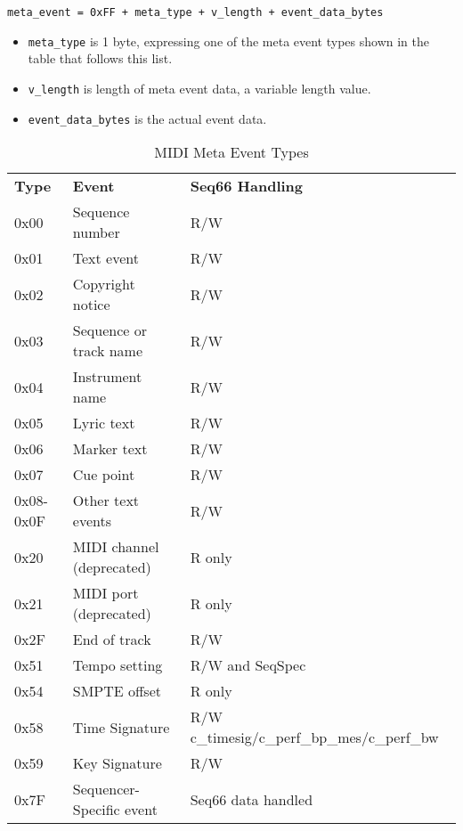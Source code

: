    \texttt{meta\_event = 0xFF + meta\_type + v\_length + event\_data\_bytes}

   \begin{itemize}
      \item \texttt{meta\_type} is 1 byte, expressing one of the meta event
         types shown in the table that follows this list.
      \item \texttt{v\_length} is length of meta event data, a variable
         length value.
      \item \texttt{event\_data\_bytes} is the actual event data.
   \end{itemize}

   \begin{table}
      \centering
      \caption{MIDI Meta Event Types}
      \label{table:midi_meta_event_types}
      \begin{tabular}{l l l}
         \textbf{Type} & \textbf{Event} & \textbf{Seq66 Handling}\\
         0x00 & Sequence number                 & R/W \\
         0x01 & Text event                      & R/W \\
         0x02 & Copyright notice                & R/W \\
         0x03 & Sequence or track name          & R/W \\
         0x04 & Instrument name                 & R/W \\
         0x05 & Lyric text                      & R/W \\
         0x06 & Marker text                     & R/W \\
         0x07 & Cue point                       & R/W \\
         0x08-0x0F & Other text events          & R/W \\
         0x20 & MIDI channel (deprecated)       & R only \\
         0x21 & MIDI port (deprecated)          & R only \\
         0x2F & End of track                    & R/W \\
         0x51 & Tempo setting                   & R/W and SeqSpec \\
         0x54 & SMPTE offset                    & R only \\
         0x58 & Time Signature & R/W c\_timesig/c\_perf\_bp\_mes/c\_perf\_bw \\
         0x59 & Key Signature                   & R/W \\
         0x7F & Sequencer-Specific event        & Seq66 data handled \\
      \end{tabular}
   \end{table}

